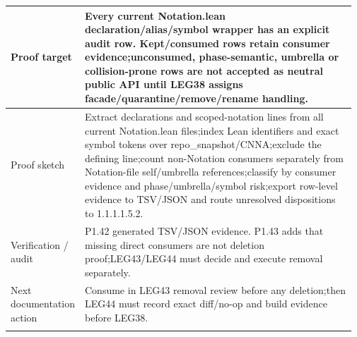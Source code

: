\begin{longtable}{L{0.16\linewidth} L{0.81\linewidth}}
\hline\addlinespace[0.20em]
Proof target & Every current Notation.lean declaration/\allowbreak{}alias/\allowbreak{}symbol wrapper has an explicit audit row. Kept/\allowbreak{}consumed rows retain consumer evidence;\newline unconsumed, phase-semantic, umbrella or collision-prone rows are not accepted as neutral public API until LEG38 assigns facade/\allowbreak{}quarantine/\allowbreak{}remove/\allowbreak{}rename handling.\\
\hline\addlinespace[0.20em]
Proof sketch & Extract declarations and scoped-notation lines from all current Notation.lean files;\newline index Lean identifiers and exact symbol tokens over repo\_snapshot/\allowbreak{}CNNA;\newline exclude the defining line;\newline count non-Notation consumers separately from Notation-file self/\allowbreak{}umbrella references;\newline classify by consumer evidence and phase/\allowbreak{}umbrella/\allowbreak{}symbol risk;\newline export row-level evidence to TSV/\allowbreak{}JSON and route unresolved dispositions to 1.1.1.1.5.2.\\
\hline\addlinespace[0.20em]
Verification /\allowbreak{} audit & P1.42 generated TSV/\allowbreak{}JSON evidence. P1.43 adds that missing direct consumers are not deletion proof;\newline LEG43/\allowbreak{}LEG44 must decide and execute removal separately.\\
\hline\addlinespace[0.20em]
Next documentation action & Consume in LEG43 removal review before any deletion;\newline then LEG44 must record exact diff/\allowbreak{}no-op and build evidence before LEG38.\\
\hline\addlinespace[0.20em]
\end{longtable}
